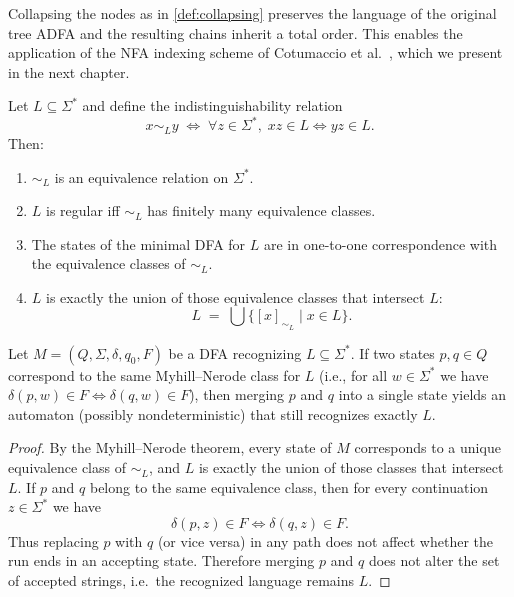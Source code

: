 Collapsing the nodes as in \cref{def:collapsing} preserves the language of the original tree ADFA and the resulting chains inherit a total order. This enables the application of the NFA indexing scheme of Cotumaccio et al.~\cite{cotumaccio2023co}, which we present in the next chapter.

\begin{theorem}
Let $L \subseteq \Sigma^*$ and define the indistinguishability relation
\[
x \sim_L y \;\Longleftrightarrow\; \forall z \in \Sigma^*,\; xz \in L \iff yz \in L .
\]
Then:
\begin{enumerate}
    \item $\sim_L$ is an equivalence relation on $\Sigma^*$.
    \item $L$ is regular iff $\sim_L$ has finitely many equivalence classes.
    \item The states of the minimal DFA for $L$ are in one-to-one correspondence with the equivalence classes of $\sim_L$.
    \item $L$ is exactly the union of those equivalence classes that intersect $L$:
    \[
        L \;=\; \bigcup \{ [x]_{\sim_L} \mid x \in L \}.
    \]
\end{enumerate}
\end{theorem}

\begin{lemma}
Let $M=(Q,\Sigma,\delta,q_0,F)$ be a DFA recognizing $L \subseteq \Sigma^*$.
If two states $p,q \in Q$ correspond to the same Myhill--Nerode class for $L$ (i.e., for all $w\in\Sigma^*$ we have $\delta(p,w)\in F \iff \delta(q,w)\in F$),
then merging $p$ and $q$ into a single state yields an automaton (possibly nondeterministic) that still recognizes exactly $L$.
\end{lemma}

\begin{proof}
By the Myhill--Nerode theorem, every state of $M$ corresponds to a unique equivalence class of $\sim_L$, and $L$ is exactly the union of those classes that intersect $L$.
If $p$ and $q$ belong to the same equivalence class, then for every continuation $z \in \Sigma^*$ we have
\[
\delta(p,z) \in F \iff \delta(q,z) \in F.
\]
Thus replacing $p$ with $q$ (or vice versa) in any path does not affect whether the run ends in an accepting state. Therefore merging $p$ and $q$ does not alter the set of accepted strings, i.e.\ the recognized language remains $L$.
\end{proof} 